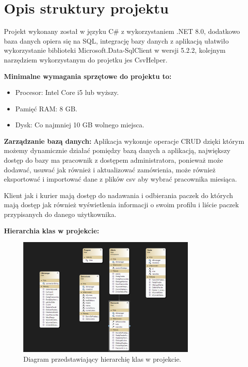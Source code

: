 \chapter{Opis struktury projektu}
Projekt wykonany został w języku C\# z wykorzystaniem .NET 8.0, dodatkowo baza danych opiera się na SQL, integrację bazy danych z aplikacją ułatwiło wykorzystanie biblioteki Microsoft.Data-SqlClient w wersji 5.2.2, kolejnym narzędziem wykorzystanym do projetku jes CsvHelper.

\noindent \textbf{Minimalne wymagania sprzętowe do projektu to:}
\begin{itemize}
    \item Procesor: Intel Core i5 lub wyższy.
    \item Pamięć RAM: 8 GB.
    \item Dysk: Co najmniej 10 GB wolnego miejsca.
\end{itemize}

\noindent \textbf{Zarządzanie bazą danych:}
Aplikacja wykonuje operacje CRUD dzięki którym możemy dynamicznie działać pomiędzy bazą danych a aplikacją, największy dostęp do bazy ma pracownik z dostępem administratora, ponieważ może dodawać, usuwać jak również i aktualizować zamówienia, może również eksportować i importować dane z plików csv aby wybrać pracownika miesiąca.

Klient jak i kurier mają dostęp do nadawania i odbierania paczek do których mają dostęp jak również wyświetlenia informacji o swoim profilu i liście paczek przypisanych do danego użytkownika.

\noindent \textbf{Hierarchia klas w projekcie:}

\begin{figure}[h!]
    \centering
    \includegraphics[width=0.8\textwidth]{diagram klas.png}
    \caption{Diagram przedstawiający hierarchię klas w projekcie.}
\end{figure}


